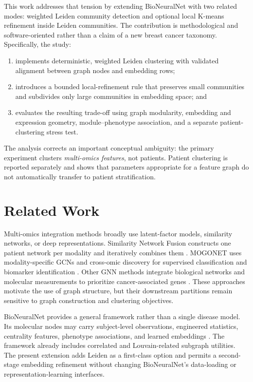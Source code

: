 \documentclass[11pt]{article}
\begin{document}
This work addresses that tension by extending BioNeuralNet with two related modes: weighted Leiden community detection and optional local K-means refinement inside Leiden communities. The contribution is methodological and software-oriented rather than a claim of a new breast cancer taxonomy. Specifically, the study:
\begin{enumerate}
    \item implements deterministic, weighted Leiden clustering with validated alignment between graph nodes and embedding rows;
    \item introduces a bounded local-refinement rule that preserves small communities and subdivides only large communities in embedding space; and
    \item evaluates the resulting trade-off using graph modularity, embedding and expression geometry, module--phenotype association, and a separate patient-clustering stress test.
\end{enumerate}

The analysis corrects an important conceptual ambiguity: the primary experiment clusters \emph{multi-omics features}, not patients. Patient clustering is reported separately and shows that parameters appropriate for a feature graph do not automatically transfer to patient stratification.

\section{Related Work}

Multi-omics integration methods broadly use latent-factor models, similarity networks, or deep representations. Similarity Network Fusion constructs one patient network per modality and iteratively combines them \cite{wang2014snf}. MOGONET uses modality-specific GCNs and cross-omic discovery for supervised classification and biomarker identification \cite{wang2021mogonet}. Other GNN methods integrate biological networks and molecular measurements to prioritize cancer-associated genes \cite{schultesasse2021}. These approaches motivate the use of graph structure, but their downstream partitions remain sensitive to graph construction and clustering objectives.

BioNeuralNet provides a general framework rather than a single disease model. Its molecular nodes may carry subject-level observations, engineered statistics, centrality features, phenotype associations, and learned embeddings \cite{ramos2026}. The framework already includes correlated and Louvain-related subgraph utilities. The present extension adds Leiden as a first-class option and permits a second-stage embedding refinement without changing BioNeuralNet's data-loading or representation-learning interfaces.
\end{document}
